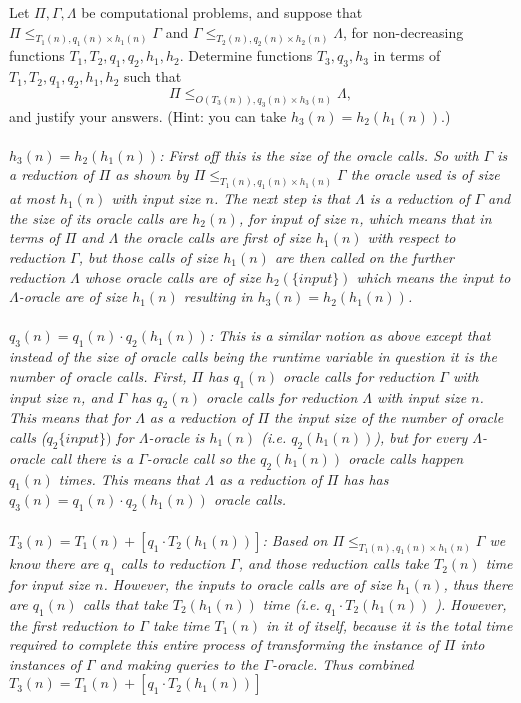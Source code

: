 \documentclass[11pt]{article}
\begin{document}
\begin{enumerate}
    Let $\Pi, \Gamma, \Lambda$ be computational problems, and suppose that $\Pi\leq_{T_1(n),q_1(n)\times h_1(n)} \Gamma$ and $\Gamma \leq_{T_2(n),q_2(n)\times h_2(n)} \Lambda$, for non-decreasing functions $T_1,T_2,q_1,q_2,h_1,h_2$.  Determine functions $T_3,q_3,h_3$ in terms of $T_1,T_2,q_1,q_2,h_1,h_2$ such that 
    $$\Pi \leq_{O(T_3(n)),q_3(n)\times h_3(n)} \Lambda,$$
    and justify your answers. 
    (Hint: you can take $h_3(n)=h_2(h_1(n))$.)  
    \\\\\textit{
    $h_3(n) = h_2(h_1(n))$: First off this is the size of the oracle calls. So with $\Gamma$ is a reduction of $\Pi$ as shown by $\Pi\leq_{T_1(n),q_1(n)\times h_1(n)} \Gamma$ the oracle used is of size at most $h_1(n)$ with input size $n$. The next step is that $\Lambda$ is a reduction of $\Gamma$ and the size of its oracle calls are $h_2(n)$, for input of size $n$, which means that in terms of $\Pi$ and $\Lambda$ the oracle calls are first of size $h_1(n)$ with respect to reduction $\Gamma$, but those calls of size $h_1(n)$ are then called on the further reduction $\Lambda$ whose oracle calls are of size $h_2(\{input\})$ which means the input to $\Lambda$-oracle are of size $h_1(n)$ resulting in $h_3(n) = h_2(h_1(n))$.
    \\\\$q_3(n) = q_1(n) \cdot q_2(h_1(n))$: This is a similar notion as above except that instead of the size of oracle calls being the runtime variable in question it is the number of oracle calls. First, $\Pi$ has $q_1(n)$ oracle calls for reduction $\Gamma$ with input size $n$, and $\Gamma$ has $q_2(n)$ oracle calls for reduction $\Lambda$ with input size $n$. This means that for $\Lambda$ as a reduction of $\Pi$ the input size of the number of oracle calls ($q_2\{input\})$ for $\Lambda$-oracle is $h_1(n)$ (i.e. $q_2(h_1(n))$), but for every $\Lambda$-oracle call there is a $\Gamma$-oracle call so the $q_2(h_1(n))$ oracle calls happen $q_1(n)$ times. This means that $\Lambda$ as a reduction of $\Pi$ has  has $q_3(n) = q_1(n) \cdot q_2(h_1(n))$ oracle calls.
    \\\\ $T_3(n) = T_1(n) + [q_1 \cdot T_2(h_1(n))]$: Based on $\Pi\leq_{T_1(n),q_1(n)\times h_1(n)} \Gamma$ we know there are $q_1$ calls to reduction $\Gamma$, and those reduction calls take $T_2(n)$ time for input size $n$. However, the inputs to oracle calls are of size $h_1(n)$, thus there are $q_1(n)$ calls that take $T_2(h_1(n))$ time (i.e. $q_1 \cdot T_2(h_1(n))$ ). However, the first reduction to $\Gamma$ take time $T_1(n)$ in it of itself, because it is the total time required to complete this entire process of transforming the instance of $\Pi$ into instances of $\Gamma$ and making queries to the $\Gamma$-oracle. Thus combined $T_3(n) = T_1(n) + [q_1 \cdot T_2(h_1(n))]$
    }
    

\end{enumerate}
\end{document}
